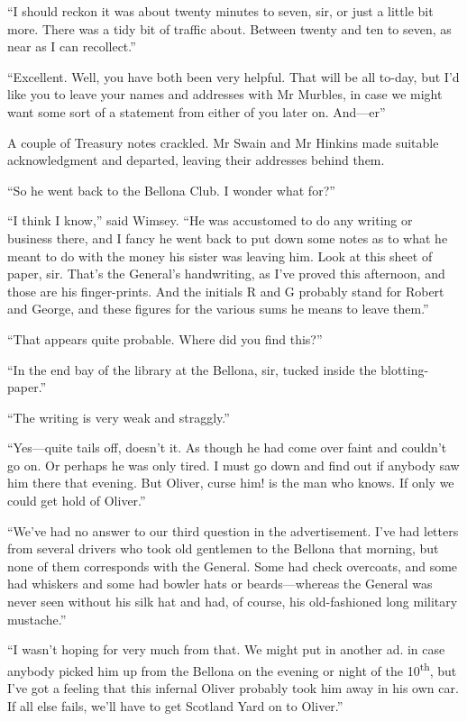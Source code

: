 \enquote{I should reckon it was about twenty minutes to seven, sir, or just a little bit more. There was a tidy bit of traffic about. Between twenty and ten to seven, as near as I can recollect.}

\enquote{Excellent. Well, you have both been very helpful. That will be all to-day, but I'd like you to leave your names and addresses with Mr Murbles, in case we might want some sort of a statement from either of you later on. And\allowbreak---\allowbreak er\longdash}

A couple of Treasury notes crackled. Mr Swain and Mr Hinkins made suitable acknowledgment and departed, leaving their addresses behind them.

\enquote{So he went back to the Bellona Club. I wonder what for?}

\enquote{I think I know,} said Wimsey. \enquote{He was accustomed to do any writing or business there, and I fancy he went back to put down some notes as to what he meant to do with the money his sister was leaving him. Look at this sheet of paper, sir. That's the General's handwriting, as I've proved this afternoon, and those are his finger-prints. And the initials R and G probably stand for Robert and George, and these figures for the various sums he means to leave them.}

\enquote{That appears quite probable. Where did you find this?}

\enquote{In the end bay of the library at the Bellona, sir, tucked inside the blotting-paper.}

\enquote{The writing is very weak and straggly.}

\enquote{Yes\allowbreak---\allowbreak quite tails off, doesn't it. As though he had come over faint and couldn't go on. Or perhaps he was only tired. I must go down and find out if anybody saw him there that evening. But Oliver, curse him! is the man who knows. If only we could get hold of Oliver.}

\enquote{We've had no answer to our third question in the advertisement. I've had letters from several drivers who took old gentlemen to the Bellona that morning, but none of them corresponds with the General. Some had check overcoats, and some had whiskers and some had bowler hats or beards\allowbreak---\allowbreak whereas the General was never seen without his silk hat and had, of course, his old-fashioned long military mustache.}

\enquote{I wasn't hoping for very much from that. We might put in another ad. in case anybody picked him up from the Bellona on the evening or night of the  10\textsuperscript{th}, but I've got a feeling that this infernal Oliver probably took him away in his own car. If all else fails, we'll have to get Scotland Yard on to Oliver.}

